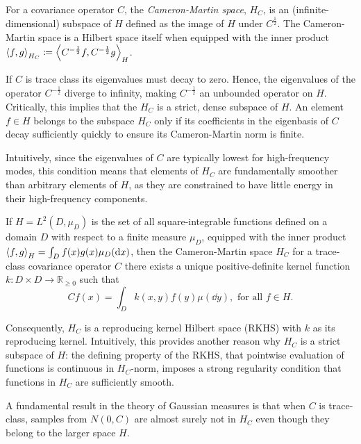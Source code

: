 For a covariance operator \(C\), the \textit{Cameron-Martin space}, \(H_{C}\), is an (infinite-dimensional) subspace of \(H\) defined as the image of \(H\) under \(C^{\frac{1}{2}}\). The Cameron-Martin space is a Hilbert space itself when equipped with the inner product \(\ev{f, g}_{H_{C}} \coloneqq \ev{C^{-\frac{1}{2}}f, C^{-\frac{1}{2}}g}_{H}\).

If \(C\) is trace class its eigenvalues must decay to zero. Hence, the eigenvalues of the operator \(C^{-\frac{1}{2}}\) diverge to infinity, making \(C^{-\frac{1}{2}}\) an unbounded operator on \(H\). Critically, this implies that the \(H_{C}\) is a strict, dense subspace of \(H\). An element \(f \in H\) belongs to the subspace \(H_{C}\) only if its coefficients in the eigenbasis of \(C\) decay sufficiently quickly to ensure its Cameron-Martin norm is finite.

Intuitively, since the eigenvalues of \(C\) are typically lowest for high-frequency modes, this condition means that elements of \(H_{C}\) are fundamentally smoother than arbitrary elements of \(H\), as they are constrained to have little energy in their high-frequency components.

If \(H = L^{2}(D, \mu_{D})\) is the set of all square-integrable functions defined on a domain \(D\) with respect to a finite measure \(\mu_{D}\), equipped with the inner product \(\ev{f, g}_{H} = \int_{D} f(x) g(x) \mu_{D}(\dd{x})\), then the Cameron-Martin space \(H_{C}\) for a trace-class covariance operator \(C\) there exists a unique positive-definite kernel function \(k: D \times D \to \mathbb{R}_{\geq 0}\) such that
\[
  Cf(x) = \int_{D} k(x, y)f(y) \mu(\dd{y}), \text{ for all } f \in H.
\]

Consequently, \(H_{C}\) is a reproducing kernel Hilbert space (RKHS) with \(k\) as its reproducing kernel. Intuitively, this provides another reason why \(H_{C}\) is a strict subspace of \(H\): the defining property of the RKHS, that pointwise evaluation of functions is continuous in \(H_{C}\)-norm, imposes a strong regularity condition that functions in \(H_{C}\) are sufficiently smooth.

A fundamental result in the theory of Gaussian measures is that when \(C\) is trace-class, samples from \(N(0, C)\) are almost surely not in \(H_{C}\) even though they belong to the larger space \(H\). %



